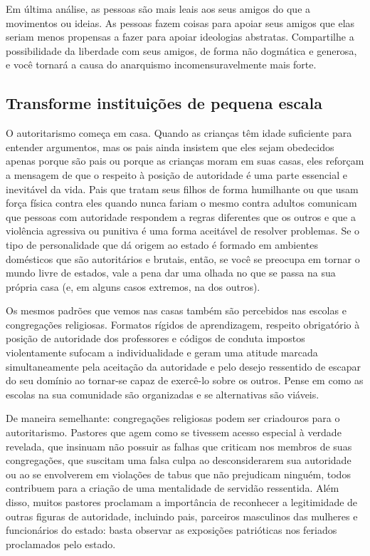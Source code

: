 Em última análise, as pessoas são mais leais aos seus amigos do que a movimentos ou ideias. As pessoas fazem coisas para apoiar seus amigos que elas seriam menos propensas a fazer para apoiar ideologias abstratas. Compartilhe a possibilidade da liberdade com seus amigos, de forma não dogmática e generosa, e você tornará a causa do anarquismo incomensuravelmente mais forte.

\subsection*{Transforme instituições de pequena escala}

O autoritarismo começa em casa. Quando as crianças têm idade suficiente para entender argumentos, mas os pais ainda insistem que eles sejam obedecidos apenas porque são pais ou porque as crianças moram em suas casas, eles reforçam a mensagem de que o respeito à posição de autoridade é uma parte essencial e inevitável da vida. Pais que tratam seus filhos de forma humilhante ou que usam força física contra eles quando nunca fariam o mesmo contra adultos comunicam que pessoas com autoridade respondem a regras diferentes que os outros e que a violência agressiva ou punitiva é uma forma aceitável de resolver problemas. Se o tipo de personalidade que dá origem ao estado é formado em ambientes domésticos que são autoritários e brutais, então, se você se preocupa em tornar o mundo livre de estados, vale a pena dar uma olhada no que se passa na sua própria casa (e, em alguns casos extremos, na dos outros).

Os mesmos padrões que vemos nas casas também são percebidos nas escolas e congregações religiosas. Formatos rígidos de aprendizagem, respeito obrigatório à posição de autoridade dos professores e códigos de conduta impostos violentamente sufocam a individualidade e geram uma atitude marcada simultaneamente pela aceitação da autoridade e pelo desejo ressentido de escapar do seu domínio ao tornar-se capaz de exercê-lo sobre os outros. Pense em como as escolas na sua comunidade são organizadas e se alternativas são viáveis.

De maneira semelhante: congregações religiosas podem ser criadouros para o autoritarismo. Pastores que agem como se tivessem acesso especial à verdade revelada, que insinuam não possuir as falhas que criticam nos membros de suas congregações, que suscitam uma falsa culpa ao desconsiderarem sua autoridade ou ao se envolverem em violações de tabus que não prejudicam ninguém, todos contribuem para a criação de uma mentalidade de servidão ressentida. Além disso, muitos pastores proclamam a importância de reconhecer a legitimidade de outras figuras de autoridade, incluindo pais, parceiros masculinos das mulheres e funcionários do estado: basta observar as exposições patrióticas nos feriados proclamados pelo estado.

